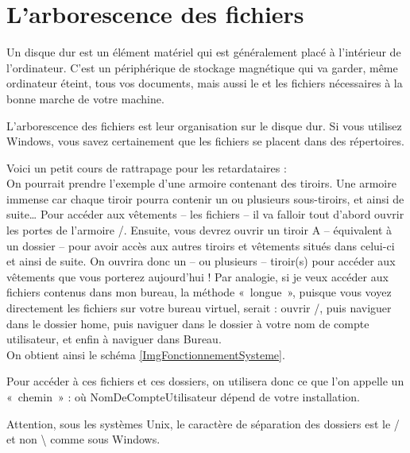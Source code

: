 \section{L'arborescence des fichiers}
\label{RefArboFichiers}
Un disque dur est un élément matériel qui est généralement placé à l'intérieur de l'ordinateur. C'est un périphérique de stockage magnétique qui va garder, même ordinateur éteint, tous vos documents, mais aussi le  et les fichiers nécessaires à la bonne marche de votre machine.\par
L'arborescence des fichiers est leur organisation sur le disque dur. Si vous utilisez Windows, vous savez certainement que les fichiers se placent dans des répertoires.\par
Voici un petit cours de rattrapage pour les retardataires :\\
On pourrait prendre l'exemple d'une armoire contenant des tiroirs. Une armoire immense car chaque tiroir pourra contenir un ou plusieurs sous-tiroirs, et ainsi de suite\ldots{} Pour accéder aux vêtements -- les fichiers -- il va falloir tout d'abord ouvrir les portes de l'armoire /. Ensuite, vous devrez ouvrir un tiroir A -- équivalent à un dossier -- pour avoir accès aux autres tiroirs et vêtements situés dans celui-ci et ainsi de suite. On ouvrira donc un -- ou plusieurs -- tiroir(s) pour accéder aux vêtements que vous porterez aujourd'hui ! Par analogie, si je veux accéder aux fichiers contenus dans mon bureau, la méthode «~longue~», puisque vous voyez directement les fichiers sur votre bureau virtuel, serait : ouvrir /, puis naviguer dans le dossier home, puis naviguer dans le dossier à votre  nom de compte utilisateur, et enfin à naviguer dans Bureau.\\
On obtient ainsi le schéma \ref{ImgFonctionnementSysteme}.\par
{}
Pour accéder à ces fichiers et ces dossiers, on utilisera donc ce que l'on appelle un «~chemin~» :
 où NomDeCompteUtilisateur dépend de votre installation.\par
\begin{nota}
Attention, sous les systèmes Unix, le caractère de séparation des dossiers est le / et non \textbackslash{} comme sous Windows.
\end{nota}
